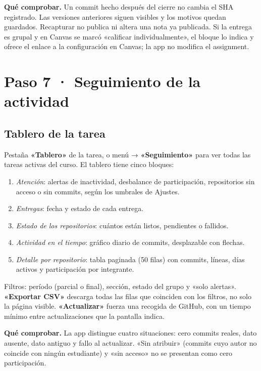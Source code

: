 \documentclass[11pt,a4paper]{article}
\newenvironment{comprobar}
  {\def\FrameCommand{\fcolorbox{verde}{verdefondo}}\MakeFramed{\advance\hsize-\width\FrameRestore}\noindent\textbf{\textcolor{verde}{Qué comprobar.}} }
  {\endMakeFramed}
\newcommand{\ui}[1]{\textbf{«#1»}}        %
\begin{document}
\begin{comprobar}
Un commit hecho después del cierre no cambia el SHA registrado. Las versiones anteriores siguen visibles y los motivos quedan guardados. Recapturar no publica ni altera una nota ya publicada. Si la entrega es grupal y en Canvas se marcó «calificar individualmente», el bloque lo indica y ofrece el enlace a la configuración en Canvas; la app no modifica el assignment.
\end{comprobar}

\section{Paso 7 · Seguimiento de la actividad}

\subsection{Tablero de la tarea}

Pestaña \ui{Tablero} de la tarea, o menú → \ui{Seguimiento} para ver todas las tareas activas del curso. El tablero tiene cinco bloques:

\begin{enumerate}
  \item \emph{Atención}: alertas de inactividad, desbalance de participación, repositorios sin acceso o sin commits, según los umbrales de Ajustes.
  \item \emph{Entregas}: fecha y estado de cada entrega.
  \item \emph{Estado de los repositorios}: cuántos están listos, pendientes o fallidos.
  \item \emph{Actividad en el tiempo}: gráfico diario de commits, desplazable con flechas.
  \item \emph{Detalle por repositorio}: tabla paginada (50 filas) con commits, líneas, días activos y participación por integrante.
\end{enumerate}

Filtros: período (parcial o final), sección, estado del grupo y «solo alertas». \ui{Exportar CSV} descarga todas las filas que coinciden con los filtros, no solo la página visible. \ui{Actualizar} fuerza una recogida de GitHub, con un tiempo mínimo entre actualizaciones que la pantalla indica.

\begin{comprobar}
La app distingue cuatro situaciones: cero commits reales, dato ausente, dato antiguo y fallo al actualizar. «Sin atribuir» (commits cuyo autor no coincide con ningún estudiante) y «sin acceso» no se presentan como cero participación.
\end{comprobar}
\end{document}
